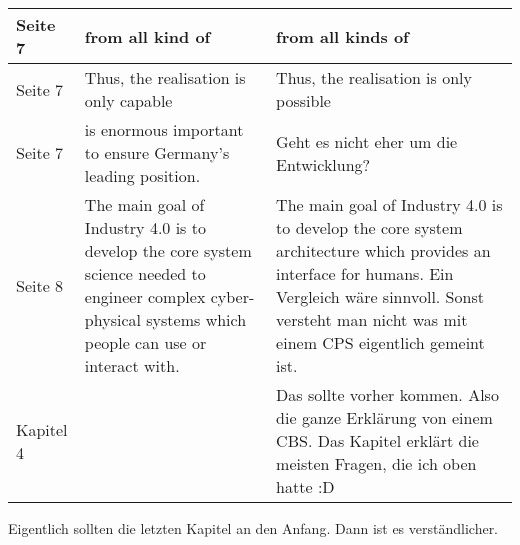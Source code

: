\documentclass{article}
\begin{document}
\begin{tabularx}{\textwidth}{|l|X|X|}
    \hline
    Seite 7 & from all kind of & from all kinds of\\
    \hline
    Seite 7 & Thus, the realisation is only capable & Thus, the realisation is only possible\\
    \hline
    Seite 7 & is enormous important to ensure
    Germany’s leading position. & Geht es nicht eher um die Entwicklung?\\
    \hline
    Seite 8 & The main goal of Industry 4.0 is to develop the core system science needed to engineer
complex cyber-physical systems which people can use or interact with. & The main goal of Industry 4.0 is to develop the core system architecture which provides an interface for humans. Ein Vergleich wäre sinnvoll. Sonst versteht man nicht was mit einem CPS eigentlich gemeint ist.\\
    \hline
    Kapitel 4 & & Das sollte vorher kommen. Also die ganze Erklärung von einem CBS. Das Kapitel erklärt die meisten Fragen, die ich oben hatte :D\\ 
    \hline
    
\end{tabularx}

Eigentlich sollten die letzten Kapitel an den Anfang. Dann ist es verständlicher.
\end{document}
